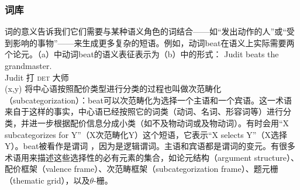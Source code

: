 \subsubsection{词库}
\label{Abschnitt-GB-Lexikon}
词的意义告诉我们它们需要与某种语义角色的词结合——如“发出动作的人”或“受到影响的事物”——来生成更多复杂的短语。例如，动词beat在语义上实际需要两个论元。（a）中动词beat的语义表征表示为（b）中的形式：
\eal
\ex 
\gll Judit beats the grandmaster.\\
Judit 打 \textsc{det} 大师\\
\ex {}(x,y)
\zl
\noindent
将中心语按照配价类型进行分类的过程也叫做次范畴化（subcategorization）：\label{Seite-Subkategoriesierung}beat可以次范畴化为选择一个主语和一个宾语。这一术语来自于这样的事实，中心语已经按照它的词类（动词、名词、形容词等）进行分类，并进一步根据配价信息分成小类（如不及物动词或及物动词）。有时会用“X subcategorizes for Y”（X次范畴化Y）这个短语，它表示“X selects
Y”（X选择Y）。beat被看作是谓词 ，因为是逻辑谓词。主语和宾语都是谓词的变元。有很多术语用来描述这些选择性的必有元素的集合，如论元结构（argument structure）、配价框架（valence frame）、次范畴框架（subcategorization frame）、题元栅（thematic grid），以及$\theta$-栅。
